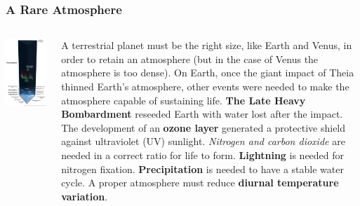 \begin{frame}
\frametitle{A Rare Atmosphere}

\begin{columns}

\includegraphics[scale=0.25]{atmosphere}


A terrestrial planet must be the right size, like Earth and Venus, in order to retain an atmosphere (but in the case of Venus the atmosphere is too dense). On Earth, once the giant impact of Theia thinned Earth's atmosphere, other events were needed to make the atmosphere capable of sustaining life. {\bf The Late Heavy Bombardment} reseeded Earth with water lost after the impact. The development of an {\bf ozone layer} generated a protective shield against ultraviolet (UV) sunlight. {\em Nitrogen and carbon dioxide} are needed in a correct ratio for life to form. {\bf Lightning} is needed for nitrogen fixation.  {\bf Precipitation} is needed to have a stable water cycle. A proper atmosphere must reduce {\bf diurnal temperature variation}.
\end{columns}
\end{frame}


